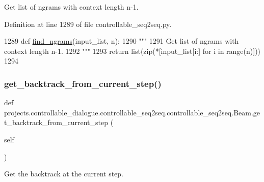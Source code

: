 \begin{DoxyVerb}Get list of ngrams with context length n-1.
\end{DoxyVerb}
 

Definition at line 1289 of file controllable\+\_\+seq2seq.\+py.


\begin{DoxyCode}
1289     \textcolor{keyword}{def }\hyperlink{namespaceparlai_1_1agents_1_1legacy__agents_1_1seq2seq_1_1dict__v0_aa7398720bbf0f8e82c5b1495313f4f8b}{find\_ngrams}(input\_list, n):
1290         \textcolor{stringliteral}{"""}
1291 \textcolor{stringliteral}{        Get list of ngrams with context length n-1.}
1292 \textcolor{stringliteral}{        """}
1293         \textcolor{keywordflow}{return} list(zip(*[input\_list[i:] \textcolor{keywordflow}{for} i \textcolor{keywordflow}{in} range(n)]))
1294 
\end{DoxyCode}
\mbox{\label{classprojects_1_1controllable__dialogue_1_1controllable__seq2seq_1_1controllable__seq2seq_1_1Beam_a614a1a51ed1ac7e209282dc223f4c8fc}} 
\subsubsection{\texorpdfstring{get\+\_\+backtrack\+\_\+from\+\_\+current\+\_\+step()}{get\_backtrack\_from\_current\_step()}}
{\footnotesize\ttfamily def projects.\+controllable\+\_\+dialogue.\+controllable\+\_\+seq2seq.\+controllable\+\_\+seq2seq.\+Beam.\+get\+\_\+backtrack\+\_\+from\+\_\+current\+\_\+step (\begin{DoxyParamCaption}\item[{}]{self }\end{DoxyParamCaption})}

\begin{DoxyVerb}Get the backtrack at the current step.
\end{DoxyVerb}
 

